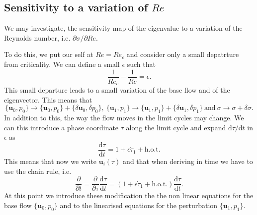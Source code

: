 \subsection{Sensitivity to a variation of $Re$}

We may investigate, the sensitivity map of the eigenvalue to a variation of the Reynolds number, i.e. $\partial \sigma/\partial Re$.

To do this, we put our self at $Re = Re_c$ and consider only a small depatrture from criticality. We can define a small $\epsilon$ such that
%
\begin{equation}
  \frac{1}{Re_c} - \frac{1}{Re} = \epsilon.
\end{equation}
%
This small departure leads to a small variation of the base flow and of the eigenvector. This means that
%
\begin{equation}
  \{ \bm{u}_0, p_0 \} \rightarrow \{ \bm{u}_0, p_0 \} + \{\delta \bm{u}_0,\delta p_0\}, \ \{ \bm{u}_1, p_1 \} \rightarrow \{ \bm{u}_1, p_1 \}  + \{\delta \bm{u}_1,\delta p_1\}\ \text{and} \ \sigma \rightarrow \sigma + \delta \sigma.
\end{equation}
%
In addition to this, the way the flow moves in the limit cycles may change. We can this introduce a phase coordinate $\tau$ along the limit cycle and expand $\text{d}\tau/\text{d}t$ in $\epsilon$ as
%
\begin{equation}
  \frac{\text{d} \tau}{\text{d} t} = 1 + \epsilon \dot{\tau}_1 +  \text{h.o.t}.
\end{equation}
%
This means that now we write $\bm{u}_i(\tau)$ and that when deriving in time we have to use the chain rule, i.e.
%
\begin{equation}
  \frac{\partial}{\partial t} = \frac{\partial}{\partial \tau} \frac{\text{d} \tau}{\text{d} t} = ( 1 + \epsilon \dot{\tau}_1 + \text{h.o.t.} ) \frac{\text{d} \tau}{\text{d} t}.
\end{equation} 
%
At this point we introduce these modification the the non linear equations for the base flow $\{\bm{u}_0,p_0\}$ and to the linearised equations for the perturbation $\{\bm{u}_1,p_1\}$.

